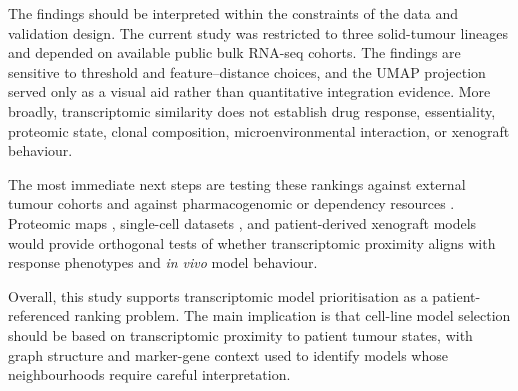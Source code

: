 The findings should be interpreted within the constraints of the data and
validation design. The current study was restricted to three solid-tumour
lineages and depended on available public bulk RNA-seq cohorts. The findings
are sensitive to threshold and feature--distance choices, and the UMAP
projection served only as a visual aid rather than quantitative integration
evidence. More broadly, transcriptomic similarity does not establish drug
response, essentiality, proteomic state, clonal composition,
microenvironmental interaction, or xenograft behaviour.

The most immediate next steps are testing these rankings against external
tumour cohorts and against pharmacogenomic or dependency resources
\citep{Barretina2012CCLE,Ghandi2019CCLE,Pacini2024DependencyMap}. Proteomic
maps \citep{Goncalves2022ProteomicMap}, single-cell datasets
\citep{Jansky2021NeuroblastomaDevelopment,Yang2021RetinoblastomaSingleCell,Qian2020PanCancerTME},
and patient-derived xenograft models \citep{Liu2023PDXModels} would provide
orthogonal tests of whether transcriptomic proximity aligns with response
phenotypes and \textit{in vivo} model behaviour.

Overall, this study supports transcriptomic model prioritisation as a
patient-referenced ranking problem. The main implication is that cell-line
model selection should be based on transcriptomic proximity to patient tumour
states, with graph structure and marker-gene context used to identify models
whose neighbourhoods require careful interpretation.
